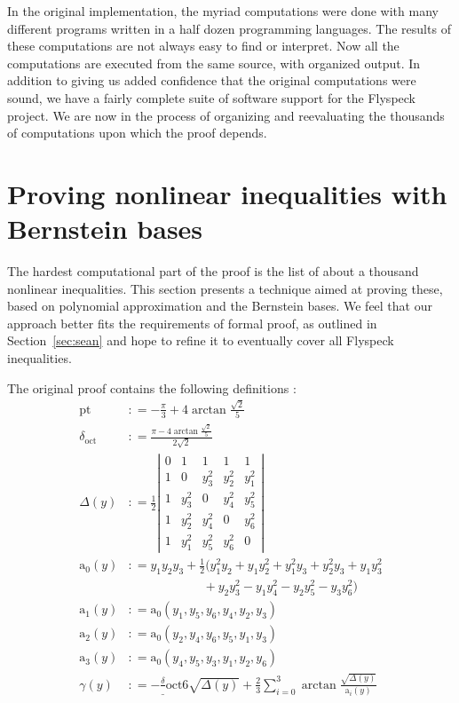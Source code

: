 \documentclass[11pt]{amsart}
\def\coloneq{\mathrel{\mathop:}=}
\def\sfrac#1#2{{\textstyle \frac {#1} {#2}}}
\def\pt{\mathrm{pt}}
\def\doct{\delta_{\mathrm{oct}}}
\def\asolid{\mathrm{a}}
\begin{document}
In the original implementation, the myriad computations were done with
many different programs written in a half dozen programming languages.
The results of these computations are not always easy to find or
interpret.  Now all the computations are executed from the same
source, with organized output.  In addition to giving us added
confidence that the original computations were sound, we have a fairly
complete suite of software support for the Flyspeck project. We are
now in the process of organizing and reevaluating the thousands of
computations upon which the proof depends.

\section{Proving nonlinear inequalities with Bernstein bases}
\label{sec:zumkeller}


The hardest computational part of the proof is the list of about a thousand nonlinear inequalities. This section presents a technique aimed at proving
these, based on polynomial approximation and the Bernstein bases. We feel that
our approach better fits the requirements of formal proof, as outlined in
Section~\ref{sec:sean} and hope to refine it to eventually cover all Flyspeck
inequalities.

The original proof contains the following definitions \cite{sp1}:
\begin{align*}
  \pt &\coloneq - \frac \pi 3 + 4 \arctan \frac{\sqrt 2}5 \\
\doct &\coloneq \frac {\pi - 4 \arctan \frac{\sqrt 2}5}{2 \sqrt 2}\\
\Delta(y) &\coloneq \frac 1 2
  \left|
  \begin{array}{ccccc}
0 & 1 & 1 & 1 & 1 \\
   1 & 0 & y_3^2 & y_2^2 & y_1^2 \\
   1 & y_3^2 & 0 & y_4^2 & y_5^2 \\
   1 & y_2^2 & y_4^2 & 0 & y_6^2 \\
   1 & y_1^2 & y_5^2 & y_6^2 & 0
  \end{array}
  \right|\\
\asolid_0(y) &\coloneq y_1 y_2 y_3 + \sfrac 1 2 (
y_1^2 y_2 + y_1 y_2^2 + y_1^2 y_3 + y_2^2 y_3 + y_1 y_3^2 \\
&\qquad\qquad\qquad {} + y_2 y_3^2 - y_1 y_4^2 - y_2 y_5^2 - y_3 y_6^2)\\
\asolid_1(y) &\coloneq \asolid_0 (y_1, y_5, y_6, y_4, y_2, y_3)\\
\asolid_2(y) &\coloneq \asolid_0 (y_2, y_4, y_6, y_5, y_1, y_3)\\
\asolid_3(y) &\coloneq \asolid_0 (y_4, y_5, y_3, y_1, y_2, y_6)\\
\gamma(y) &\coloneq 
- \frac \doct 6 \sqrt {\Delta(y)} + \frac 2 3 \sum_{i=0}^3 \arctan \frac
{\sqrt{\Delta(y)}} {\asolid_i(y)}
\end{align*}
\end{document}
